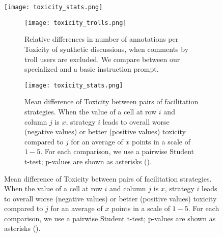 \begin{figure}
    \texttt{[image: toxicity\_stats.png]}
\begin{figure}[t]
    \centering
    \texttt{[image: toxicity\_trolls.png]}
    \caption{Relative differences in number of annotations per Toxicity of synthetic discussions, when comments by troll users are excluded. We compare between our specialized and a basic instruction prompt.}
    \label{fig:toxicity_trolls}
\end{figure}

\begin{figure}
    \texttt{[image: toxicity\_stats.png]}
	\centering
	\caption{Mean difference of Toxicity between pairs of facilitation strategies. When the value of a cell at row $i$ and column $j$ is $x$, strategy $i$ leads to overall worse (negative values) or better (positive values) toxicity compared to $j$ for an average of $x$ points in a scale of $1-5$. For each comparison, we use a pairwise Student t-test; p-values are shown as asterisks (\asterisknote).}
	\label{fig:toxicity_stats}
\end{figure}
	\caption{Mean difference of Toxicity between pairs of facilitation strategies. When the value of a cell at row $i$ and column $j$ is $x$, strategy $i$ leads to overall worse (negative values) or better (positive values) toxicity compared to $j$ for an average of $x$ points in a scale of $1-5$. For each comparison, we use a pairwise Student t-test; p-values are shown as asterisks (\asterisknote).}
	\label{fig:toxicity_stats}
\end{figure}

